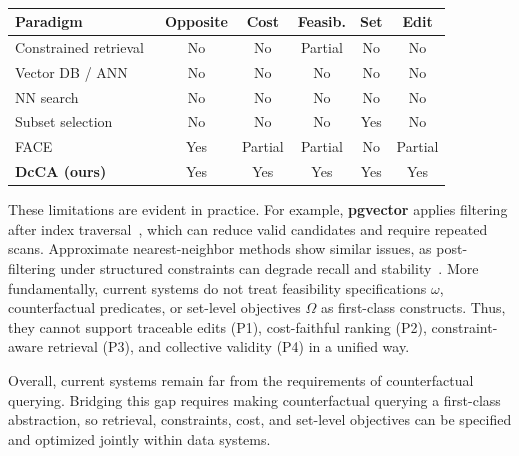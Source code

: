 
\begin{table}[t]
\centering
\footnotesize
\setlength{\tabcolsep}{4pt}
\caption{}
\label{tab:positioning}
\begin{tabular}{@{}lccccc@{}}
\toprule
Paradigm & Opposite & Cost & Feasib. & Set & Edit \\
\midrule
Constrained retrieval~\cite{lee2019constraint}      & No  & No      & Partial & No  & No \\
Vector DB / ANN~\cite{pgvector,malkov2018efficient} & No  & No      & No      & No  & No \\
NN search~\cite{indyk1998approximate}               & No  & No      & No      & No  & No \\
Subset selection~\cite{borodin2017max}              & No  & No      & No      & Yes & No \\
FACE~\cite{poyiadzi2020face}                        & Yes & Partial & Partial & No  & Partial \\
\textbf{DcCA (ours)}                                & Yes & Yes     & Yes     & Yes & Yes \\
\bottomrule
\end{tabular}
\end{table}


These limitations are evident in practice. For example, \textbf{pgvector} applies filtering after index traversal~\cite{pgvector}, which can reduce valid candidates and require repeated scans. Approximate nearest-neighbor methods show similar issues, as post-filtering under structured constraints can degrade recall and stability~\cite{dong2011efficient,malkov2018efficient}. More fundamentally, current systems do not treat feasibility specifications $\omega$, counterfactual predicates, or set-level objectives $\Omega$ as first-class constructs. Thus, they cannot support traceable edits (P1), cost-faithful ranking (P2), constraint-aware retrieval (P3), and collective validity (P4) in a unified way.

Overall, current systems remain far from the requirements of counterfactual querying. Bridging this gap requires making counterfactual querying a first-class abstraction, so retrieval, constraints, cost, and set-level objectives can be specified and optimized jointly within data systems.